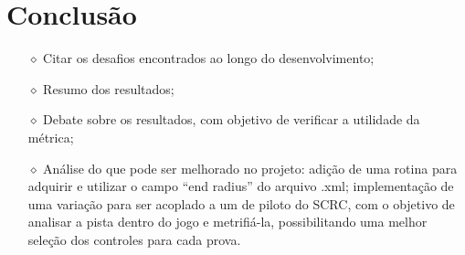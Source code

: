 \documentclass{article}
\begin{document}
\section{Conclusão}
	\begin{itemize}
		\item[$\diamond$] Citar os desafios encontrados ao longo do desenvolvimento;
		\item[$\diamond$] Resumo dos resultados;
		\item[$\diamond$] Debate sobre os resultados, com objetivo de verificar a utilidade da métrica;
		\item[$\diamond$] Análise do que pode ser melhorado no projeto: adição de uma rotina para adquirir e utilizar o campo ``end radius'' do arquivo .xml; implementação de uma variação para ser acoplado a um de piloto do SCRC, com o objetivo de analisar a pista dentro do jogo e metrifiá-la, possibilitando uma melhor seleção dos controles para cada prova. 
	\end{itemize}


{}

\end{document}
